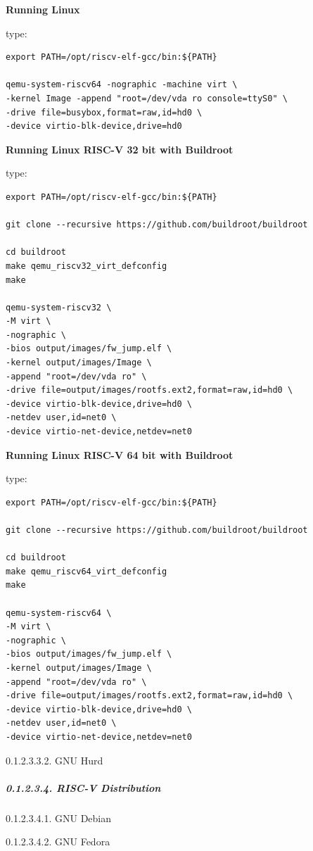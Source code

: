 \documentclass[
]{article}
\begin{document}
\textbf{Running Linux}

type:

\begin{verbatim}
export PATH=/opt/riscv-elf-gcc/bin:${PATH}

qemu-system-riscv64 -nographic -machine virt \
-kernel Image -append "root=/dev/vda ro console=ttyS0" \
-drive file=busybox,format=raw,id=hd0 \
-device virtio-blk-device,drive=hd0
\end{verbatim}

\textbf{Running Linux RISC-V 32 bit with Buildroot}

type:

\begin{verbatim}
export PATH=/opt/riscv-elf-gcc/bin:${PATH}

git clone --recursive https://github.com/buildroot/buildroot

cd buildroot
make qemu_riscv32_virt_defconfig
make

qemu-system-riscv32 \
-M virt \
-nographic \
-bios output/images/fw_jump.elf \
-kernel output/images/Image \
-append "root=/dev/vda ro" \
-drive file=output/images/rootfs.ext2,format=raw,id=hd0 \
-device virtio-blk-device,drive=hd0 \
-netdev user,id=net0 \
-device virtio-net-device,netdev=net0
\end{verbatim}

\textbf{Running Linux RISC-V 64 bit with Buildroot}

type:

\begin{verbatim}
export PATH=/opt/riscv-elf-gcc/bin:${PATH}

git clone --recursive https://github.com/buildroot/buildroot

cd buildroot
make qemu_riscv64_virt_defconfig
make

qemu-system-riscv64 \
-M virt \
-nographic \
-bios output/images/fw_jump.elf \
-kernel output/images/Image \
-append "root=/dev/vda ro" \
-drive file=output/images/rootfs.ext2,format=raw,id=hd0 \
-device virtio-blk-device,drive=hd0 \
-netdev user,id=net0 \
-device virtio-net-device,netdev=net0
\end{verbatim}

0.1.2.3.3.2. GNU Hurd

\hypertarget{risc-v-distribution}{%
\subparagraph{0.1.2.3.4. RISC-V
Distribution}\label{risc-v-distribution}}

0.1.2.3.4.1. GNU Debian

0.1.2.3.4.2. GNU Fedora
\end{document}
